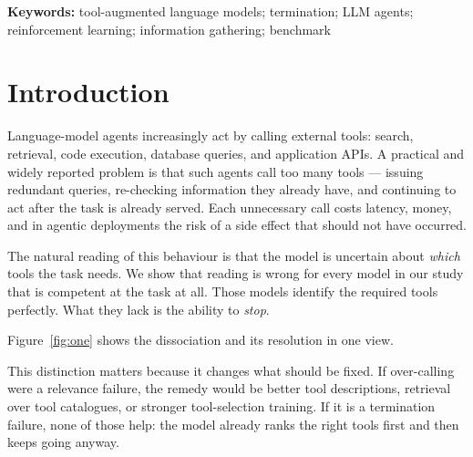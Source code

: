 \documentclass[11pt]{article}
\begin{document}
\begin{abstract}
tool recall moves only from 0.967 to 0.951. Termination tracks post-training
rather than scale. On the identical task a small
>>>>>>> 6d553f0 (fin runs)
masked-PPO policy terminates in at least 92.5\% of episodes across 20 agents and 5
seeds, and gathers conditionally, probing on 2.7\% of tasks where probing is
wasteful against 98.9\% where it is required. We additionally report a
pre-registered hypothesis that we tested and \emph{refuted} --- agents trained
where gathering is almost always necessary do not learn to always gather
($\Delta = +0.018$ under an out-of-distribution control) --- and bound the regime
in which sequential policies beat the analytic memoryless ceiling to
$\alpha \gtrsim 0.7$. We report that every termination finding here is specific to
summed log-probability scoring: under domain-conditional PMI no model terminates
at all and the $75\times$ separation vanishes, which we treat as a methodological
result rather than a caveat.
\end{abstract}

\noindent\textbf{Keywords:} tool-augmented language models; termination; LLM
agents; reinforcement learning; information gathering; benchmark

\section{Introduction}

Language-model agents increasingly act by calling external tools: search,
retrieval, code execution, database queries, and application APIs. A practical and
widely reported problem is that such agents call too many tools --- issuing
redundant queries, re-checking information they already have, and continuing to
act after the task is already served. Each unnecessary call costs latency, money,
and in agentic deployments the risk of a side effect that should not have
occurred.

The natural reading of this behaviour is that the model is uncertain about
\emph{which} tools the task needs. We show that reading is wrong for every model
in our study that is competent at the task at all. Those models identify the
required tools perfectly. What they lack is the ability to \emph{stop}.

Figure~\ref{fig:one} shows the dissociation and its resolution in one view.

This distinction matters because it changes what should be fixed. If over-calling
were a relevance failure, the remedy would be better tool descriptions, retrieval
over tool catalogues, or stronger tool-selection training. If it is a termination
failure, none of those help: the model already ranks the right tools first and
then keeps going anyway.
\end{document}
